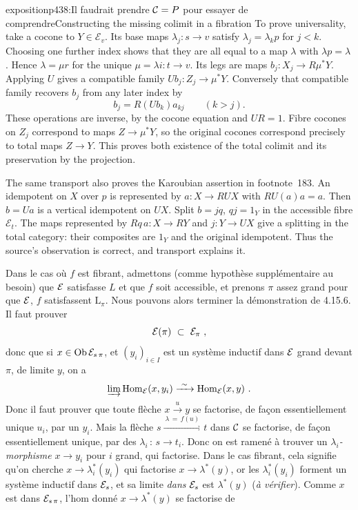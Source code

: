 \begin{dcomment}{exposition}{p438:Il faudrait prendre $\mathcal{C} = P$ pour essayer de comprendre}{Constructing the missing colimit in a fibration}
To prove universality, take a cocone to $Y\in\mathcal E_v$. Its base maps $\lambda_j:s\to v$ satisfy $\lambda_j=\lambda_kp$ for $j<k$. Choosing one further index shows that they are all equal to a map $\lambda$ with $\lambda p=\lambda$. Hence $\lambda=\mu r$ for the unique $\mu=\lambda i:t\to v$. Its legs are maps $b_j:X_j\to R\mu^*Y$. Applying $U$ gives a compatible family $Ub_j:Z_j\to\mu^*Y$. Conversely that compatible family recovers $b_j$ from any later index by
\[
 b_j=R(Ub_k)a_{kj}\qquad(k>j).
\]
These operations are inverse, by the cocone equation and $UR=1$. Fibre cocones on $Z_j$ correspond to maps $Z\to\mu^*Y$, so the original cocones correspond precisely to total maps $Z\to Y$. This proves both existence of the total colimit and its preservation by the projection.

The same transport also proves the Karoubian assertion in footnote~183. An idempotent on $X$ over $p$ is represented by $a:X\to RUX$ with $RU(a)a=a$. Then $b=Ua$ is a vertical idempotent on $UX$. Split $b=jq$, $qj=1_Y$ in the accessible fibre $\mathcal E_t$. The maps represented by $Rq\,a:X\to RY$ and $j:Y\to UX$ give a splitting in the total category: their composites are $1_Y$ and the original idempotent. Thus the source's observation is correct, and transport explains it.
\end{dcomment}


Dans le cas où $f$ est fibrant, admettons (comme hypothèse supplémentaire au besoin) que $\mathcal{E}$ satisfasse $L$ et que $f$ soit accessible, et prenons $\pi$ assez grand pour que $\mathcal{E}$, $f$ satisfassent $\mathrm{L}_{\pi}$. Nous pouvons alors terminer la démonstration de 4.15.6. Il faut prouver
\[
\mathcal{E}(\pi) \ \subset \ \mathcal{E}_{\pi} \ ,
\]
donc que si $x \in \operatorname{Ob} \mathcal{E}_{s\,\pi}$, et $(y_i)_{i \in I}$ est un système inductif dans $\mathcal{E}$ grand devant $\pi$, de limite $y$, on a
\[
\varinjlim \operatorname{Hom}_{\mathcal{E}}(x, y_i) \xrightarrow{\ \sim\ } \operatorname{Hom}_{\mathcal{E}}(x, y) \ .
\]
Donc il faut prouver que toute flèche $x \xrightarrow{u} y$ se factorise, de façon essentiellement unique $u_i$, par un $y_i$. Mais la flèche $s \xrightarrow{\ \lambda \, = \, f(u)\ } t$ dans $\mathcal{C}$ se factorise, de façon essentiellement unique, par des $\lambda_i \, : \, s \longrightarrow t_i$. Donc on est ramené à trouver un \textit{$\lambda_i$-morphisme} $x \longrightarrow y_i$ pour $i$ grand, qui factorise. Dans le cas fibrant, cela signifie qu'on cherche $x \longrightarrow \lambda^*_i(y_i)$ qui factorise $x \longrightarrow \lambda^*(y)$, or les $\lambda^*_i(y_i)$ forment un système inductif dans $\mathcal{E}_s$, et sa limite \textit{dans} $\mathcal{E}_s$ est $\lambda^*(y)$ (\textit{à vérifier}). Comme $x$ est dans $\mathcal{E}_{s\,\pi}$, l'hom donné $x \longrightarrow \lambda^*(y)$ se factorise de

